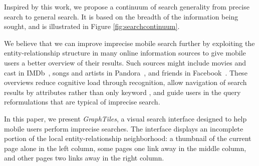 Inspired by this work, we propose a continuum of search generality from precise search to general search. It is based on the breadth of the information being sought, and is illustrated in Figure \ref{fig:searchcontinuum}.

We believe that we can improve imprecise mobile search further by exploiting the entity-relationship structure in many online information sources to give mobile users a better overview of their results. Such sources might include movies and cast in IMDb~\cite{imdb}, songs and artists in Pandora~\cite{pandora}, and friends in Facebook~\cite{Facebook}. These overviews reduce cognitive load through recognition, allow navigation of search results by attributes rather than only keyword \cite{Hearst:2002}, and guide users in the query reformulations that are typical of imprecise search.

In this paper, we present \textit{GraphTiles}, a visual search interface designed to help mobile users perform imprecise searches. The interface displays an incomplete portion of the local entity-relationship neighborhood: a thumbnail of the current page alone in the left column, some pages one link away in the middle column, and other pages two links away in the right column. 

